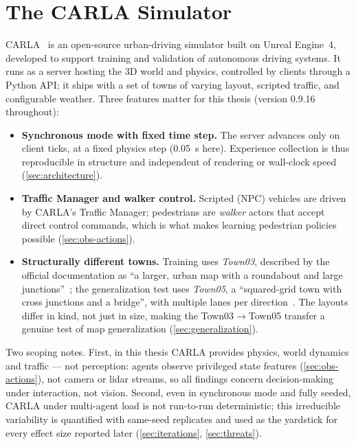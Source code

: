 \section{The CARLA Simulator}
\label{sec:carla-bg}

CARLA~\cite{dosovitskiy2017carla} is an open-source urban-driving
simulator built on Unreal Engine~4, developed to support training and
validation of autonomous driving systems. It runs as a server hosting
the 3D world and physics, controlled by clients through a Python API;
it ships with a set of towns of varying layout, scripted traffic, and
configurable weather. Three features matter for this thesis
(version 0.9.16 throughout):

\begin{itemize}
  \item \textbf{Synchronous mode with fixed time step.} The server
        advances only on client ticks, at a fixed physics step
        (\SI{0.05}{s} here). Experience collection is thus reproducible
        in structure and independent of rendering or wall-clock speed
        (\cref{sec:architecture}).
  \item \textbf{Traffic Manager and walker control.} Scripted (NPC)
        vehicles are driven by CARLA's Traffic Manager; pedestrians are
        \emph{walker} actors that accept direct control commands, which
        is what makes learning pedestrian policies possible
        (\cref{sec:obs-actions}).
  \item \textbf{Structurally different towns.} Training uses
        \emph{Town03}, described by the official documentation as ``a
        larger, urban map with a roundabout and large
        junctions''~\cite{carladocs}; the generalization test uses
        \emph{Town05}, a ``squared-grid town with cross junctions and a
        bridge'', with multiple lanes per direction~\cite{carladocs}.
        The layouts differ in kind, not just in size, making the
        Town03$\to$Town05 transfer a genuine test of map generalization
        (\cref{sec:generalization}).
\end{itemize}

Two scoping notes. First, in this thesis CARLA provides physics, world
dynamics and traffic --- not perception: agents observe privileged state
features (\cref{sec:obs-actions}), not camera or lidar streams, so all
findings concern decision-making under interaction, not vision. Second,
even in synchronous mode and fully seeded, CARLA under multi-agent load
is not run-to-run deterministic; this irreducible variability is
quantified with same-seed replicates and used as the yardstick for every
effect size reported later (\cref{sec:iterations},
\cref{sec:threats}).
